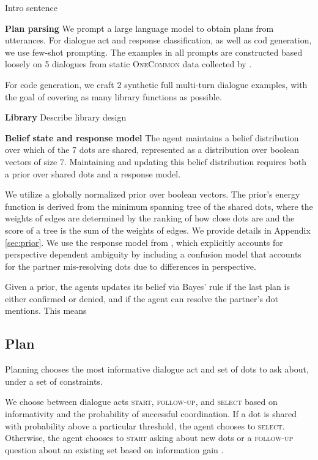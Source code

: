\documentclass[11pt]{article}
\begin{document}
Intro sentence

\textbf{Plan parsing}
We prompt a large language model to obtain plans from utterances.
For dialogue act and response classification, as well as
cod generation, we use few-shot prompting.
The examples in all prompts are constructed based loosely on
5 dialogues from static \textsc{OneCommon} data collected by \citet{onecommon}.

For code generation, we craft 2 synthetic full multi-turn dialogue examples,
with the goal of covering as many library functions as possible.

\textbf{Library}
Describe library design

\textbf{Belief state and response model}
The agent maintains a belief distribution over which of the 7
dots are shared, represented as a distribution over boolean vectors of size 7.
Maintaining and updating this belief distribution requires both a prior over shared dots
and a response model.

We utilize a globally normalized prior over boolean vectors.
The prior's energy function is derived from the minimum spanning tree of the shared dots, where the weights of edges are determined by the ranking of how close dots are and the score of a tree is the sum of the weights of edges.
We provide details in Appendix \ref{sec:prior}.
We use the response model from \citep{ocp}, which explicitly accounts for perspective dependent ambiguity
by including a confusion model that accounts for the partner mis-resolving dots due to differences in perspective.

Given a prior, the agents updates its belief via Bayes' rule if the last plan is either confirmed or denied,
and if the agent can resolve the partner's dot mentions.
This means 

\subsection{Plan}
\label{sec:plan}
Planning chooses the most informative dialogue act and set of dots to ask about, under a set of constraints.

We choose between dialogue acts \textsc{start}, \textsc{follow-up}, and \textsc{select} based on informativity and the probability of successful coordination. If a dot is shared with probability above a particular threshold, the agent chooses to \textsc{select}.
Otherwise, the agent chooses to \textsc{start} asking about 
new dots or a \textsc{follow-up} question
about an existing set based on information gain \citep{lindley}.
\end{document}
